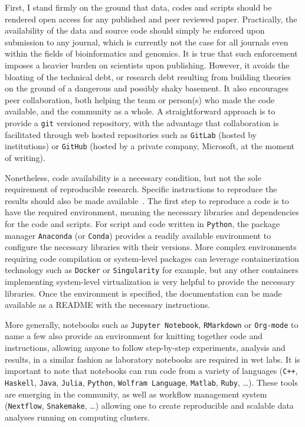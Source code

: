 First, I stand firmly on the ground that data, codes and scripts should be rendered open access for any published and peer reviewed paper.
Practically, the availability of the data and source code should simply be enforced upon submission to any journal, which is currently not the case for all journals even within the fields of bioinformatics and genomics.
It is true that such enforcement imposes a heavier burden on scientists upon publishing.
However, it avoids the bloating of the technical debt, or research debt resulting from building theories on the ground of a dangerous and possibly shaky basement.
It also encourages peer collaboration, both helping the team or person(s) who made the code available, and the community as a whole.
A straightforward approach is to provide a \texttt{git} versioned repository, with the advantage that collaboration is facilitated through web hosted repositories such as \texttt{GitLab} (hosted by institutions) or \texttt{GitHub} (hosted by a private company, Microsoft, at the moment of writing).

Nonetheless, code availability is a necessary condition, but not the sole requirement of reproducible research.
Specific instructions to reproduce the results should also be made available~\citep{Wilson2014,Darriba2018}.
The first step to reproduce a code is to have the required environment, meaning the necessary libraries and dependencies for the code and scripts.
For script and code written in \texttt{Python}, the package manager \texttt{Anaconda} (or \texttt{Conda}) provides a readily available environment to configure the necessary libraries with their versions.
More complex environments requiring code compilation or system-level packages can leverage containerization technology such as \texttt{Docker} or \texttt{Singularity} for example, but any other containers implementing system-level virtualization is very helpful to provide the necessary libraries.
Once the environment is specified, the documentation can be made available as a README with the necessary instructions.

More generally, notebooks such as \texttt{Jupyter Notebook}, \texttt{RMarkdown} or \texttt{Org-mode} to name a few also provide an environment for knitting together code and instructions, allowing anyone to follow step-by-step experiments, analysis and results, in a similar fashion as laboratory notebooks are required in wet labs.
It is important to note that notebooks can run code from a variety of languages (\texttt{C++}, \texttt{Haskell}, \texttt{Java}, \texttt{Julia}, \texttt{Python}, \texttt{Wolfram Language}, \texttt{Matlab}, \texttt{Ruby}, \ldots).
These tools are emerging in the community, as well as workflow management system (\texttt{Nextflow}, \texttt{Snakemake}, \ldots) allowing one to create reproducible and scalable data analyses running on computing clusters.

